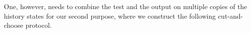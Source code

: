 

One, however, needs to combine the test and the output on multiple copies of the history states for our second purpose, where we construct the following cut-and-choose protocol.  

